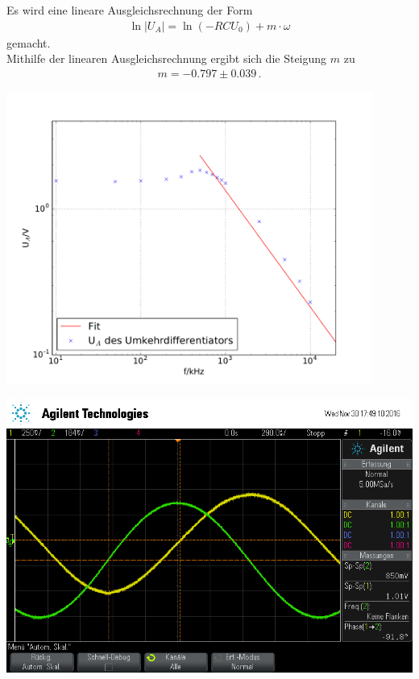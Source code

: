 \documentclass[]{scrartcl}
\begin{document}
Es wird eine lineare Ausgleichsrechnung der Form 
\begin{align}
\ln |U_A| = \ln\left(-RCU_0\right)+m\cdot\omega
\end{align}
gemacht. \\
Mithilfe der linearen Ausgleichsrechnung ergibt sich die Steigung $m$ zu
\begin{align*}
m = -0.797 \pm 0.039\,.
\end{align*}
\begin{center}
	\includegraphics[width=12cm]{images/differentiator.pdf}
	\label{fig:differentiator}
\end{center}
\begin{minipage}[t]{0.5\textwidth}
	\includegraphics[width=\textwidth]{images/sinus_diff}
	\label{fig:sinusdiff}
\end{minipage}
\end{document}

